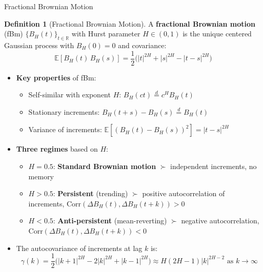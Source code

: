 \documentclass[9pt, aspectratio=169, t]{beamer}
\theoremstyle{definition}
\newtheorem{defn}{Definition}
\newcommand{\E}{\mathbb{E}}
\newcommand{\Corr}{\text{Corr}}
\newcommand{\R}{\mathbb{R}}
\begin{document}
\begin{frame}{Fractional Brownian Motion}
    \begin{defn}[Fractional Brownian Motion]
        A \textbf{fractional Brownian motion} (fBm) $\{B_H(t)\}_{t \in \R}$ with Hurst parameter $H \in (0,1)$ is the unique centered Gaussian process with $B_H(0) = 0$ and covariance:
        \[
            \E[B_H(t) \, B_H(s)] = \frac{1}{2}\bigl(|t|^{2H} + |s|^{2H} - |t-s|^{2H}\bigr)
        \]
    \end{defn}
    \begin{itemize}
        \item \textbf{Key properties} of fBm:
        \begin{itemize}
            \item Self-similar with exponent $H$: $B_H(ct) \stackrel{d}{=} c^H B_H(t)$
            \item Stationary increments: $B_H(t+s) - B_H(s) \stackrel{d}{=} B_H(t)$
            \item Variance of increments: $\E[(B_H(t) - B_H(s))^2] = |t-s|^{2H}$
        \end{itemize}
        \item \textbf{Three regimes} based on $H$:
        \begin{itemize}
            \item $H = 0.5$: \textbf{Standard Brownian motion} $\succ$ independent increments, no memory
            \item $H > 0.5$: \textbf{Persistent} (trending) $\succ$ positive autocorrelation of increments, $\Corr(\Delta B_H(t), \Delta B_H(t+k)) > 0$
            \item $H < 0.5$: \textbf{Anti-persistent} (mean-reverting) $\succ$ negative autocorrelation, $\Corr(\Delta B_H(t), \Delta B_H(t+k)) < 0$
        \end{itemize}
        \item The autocovariance of increments at lag $k$ is:
        \[
            \gamma(k) = \frac{1}{2}\bigl(|k+1|^{2H} - 2|k|^{2H} + |k-1|^{2H}\bigr) \approx H(2H-1)|k|^{2H-2} \text{ as } k \to \infty
        \]
    \end{itemize}
\end{frame}
\end{document}
